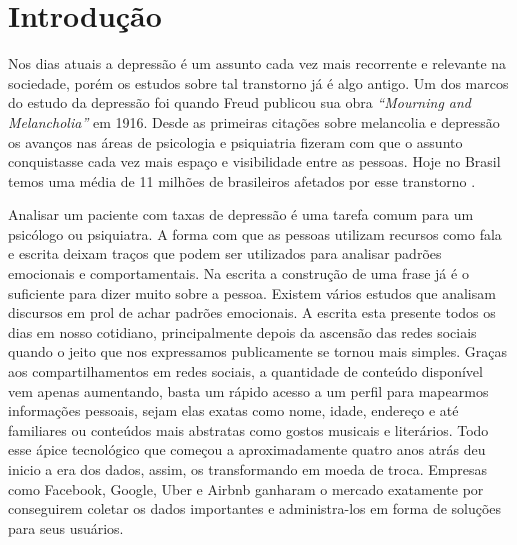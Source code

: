 \documentclass[
	12pt,				%
	openright,			%
	twoside,			%
	a4paper,			%
	english,			%
	french,				%
	spanish,			%
	brazil				%
	]{abntex2}
\begin{document}
\frenchspacing
\imprimircapa
\imprimirfolhaderosto*












\textual


\chapter*[Introdução]{Introdução}

Nos dias atuais a depressão é um assunto cada vez mais recorrente e relevante na sociedade, porém os estudos sobre tal transtorno já é algo antigo. Um dos marcos do estudo da depressão foi quando Freud publicou sua obra \textit{“Mourning and Melancholia”} em 1916. Desde as primeiras citações sobre melancolia e depressão os avanços nas áreas de psicologia e psiquiatria fizeram com que o assunto conquistasse cada vez mais espaço e visibilidade entre as pessoas. Hoje no Brasil temos uma média de 11 milhões de brasileiros afetados por esse transtorno \cite{paho2017-letstalk}.

Analisar um paciente com taxas de depressão é uma tarefa comum para um psicólogo ou psiquiatra. A forma com que as pessoas utilizam recursos como fala e escrita deixam traços que podem ser utilizados para analisar padrões emocionais e comportamentais. Na escrita a construção de uma frase já é o suficiente para dizer muito sobre a pessoa. Existem vários estudos que analisam discursos em prol de achar padrões emocionais. A escrita esta presente todos os dias em nosso cotidiano, principalmente depois da ascensão das redes sociais quando o jeito que nos expressamos publicamente se tornou mais simples.
Graças aos compartilhamentos em redes sociais, a quantidade de conteúdo disponível vem apenas aumentando, basta um rápido acesso a um perfil para mapearmos informações pessoais, sejam elas exatas como nome, idade, endereço e até familiares ou conteúdos mais abstratas como gostos musicais e literários. Todo esse ápice tecnológico que começou a aproximadamente quatro anos atrás deu inicio a era dos dados, assim, os transformando em moeda de troca. Empresas como Facebook, Google, Uber e Airbnb ganharam o mercado exatamente por conseguirem coletar os dados importantes e administra-los em forma de soluções para seus usuários.
\end{document}
